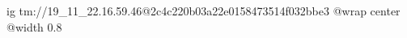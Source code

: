  
 
 
 
 

\qqSecCmtScr


\ifcmt
  ig tm://19_11_22.16.59.46@2c4c220b03a22e0158473514f032bbe3
  @wrap center
  @width 0.8
\fi


